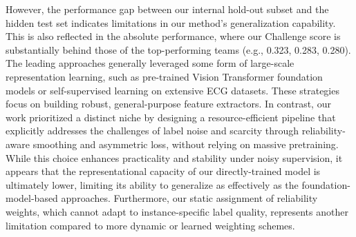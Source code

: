 \documentclass[twocolumn]{cinc}
\begin{document}

However, the performance gap between our internal hold-out subset and the hidden test set indicates limitations in our method's generalization capability. This is also reflected in the absolute performance, where our Challenge score is substantially behind those of the top-performing teams (e.g., 0.323, 0.283, 0.280). The leading approaches generally leveraged some form of large-scale representation learning, such as pre-trained Vision Transformer foundation models or self-supervised learning on extensive ECG datasets. These strategies focus on building robust, general-purpose feature extractors. In contrast, our work prioritized a distinct niche by designing a resource-efficient pipeline that explicitly addresses the challenges of label noise and scarcity through reliability-aware smoothing and asymmetric loss, without relying on massive pretraining. While this choice enhances practicality and stability under noisy supervision, it appears that the representational capacity of our directly-trained model is ultimately lower, limiting its ability to generalize as effectively as the foundation-model-based approaches. Furthermore, our static assignment of reliability weights, which cannot adapt to instance-specific label quality, represents another limitation compared to more dynamic or learned weighting schemes.

\end{document}
